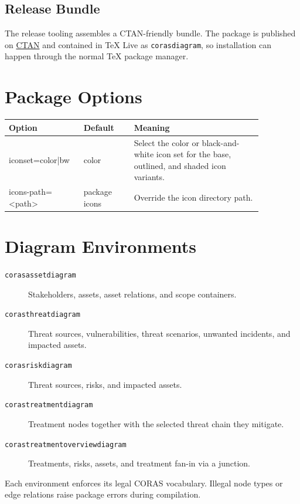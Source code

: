 \documentclass[a4paper]{article}
\begin{document}
\subsection{Release Bundle}

The release tooling assembles a CTAN-friendly bundle. The package is published
on \href{https://ctan.org/pkg/corasdiagram}{CTAN} and contained in TeX Live as
\texttt{corasdiagram}, so installation can happen through the normal TeX
package manager.

\section{Package Options}

\begin{center}
\begin{tabular}{>{\ttfamily}p{0.22\linewidth}p{0.18\linewidth}p{0.46\linewidth}}
\hline
Option & Default & Meaning \\
\hline
iconset=color|bw & color & Select the color or black-and-white icon set for the base, outlined, and shaded icon variants. \\
icons-path=<path> & package icons & Override the icon directory path. \\
\hline
\end{tabular}
\end{center}

\section{Diagram Environments}

\begin{description}
  \item[\texttt{corasassetdiagram}] Stakeholders, assets, asset relations,
    and scope containers.
  \item[\texttt{corasthreatdiagram}] Threat sources, vulnerabilities, threat
    scenarios, unwanted incidents, and impacted assets.
  \item[\texttt{corasriskdiagram}] Threat sources, risks, and impacted assets.
  \item[\texttt{corastreatmentdiagram}] Treatment nodes together with the
    selected threat chain they mitigate.
  \item[\texttt{corastreatmentoverviewdiagram}] Treatments, risks, assets, and
    treatment fan-in via a junction.
\end{description}

Each environment enforces its legal CORAS vocabulary. Illegal node types or
edge relations raise package errors during compilation.
\end{document}
